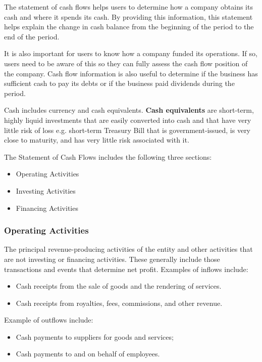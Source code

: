 \documentclass[../main.tex]{subfiles}
\begin{document}
	The statement of cash flows helps users to determine how a company obtains 
	its cash and where it spends its cash. By providing this information, this 
	statement helps explain the change in cash balance from the beginning of 
	the period to the end of the period. 
	
	It is also important for users to know how a company funded its operations. 
	If so, users need to be aware of this so they can fully assess the cash 
	flow position of the company. Cash flow information is also useful to 
	determine if the business has sufficient cash to pay its debts or if the 
	business paid dividends during the period. 
	
	Cash includes currency and cash equivalents. \textbf{Cash equivalents} are 
	short-term, highly liquid investments that are easily converted into cash 
	and that have very little risk of loss e.g. short-term Treasury Bill that 
	is government-issued, is very close to maturity, and has very little risk 
	associated with it. 
	
	The Statement of Cash Flows includes the following three sections:
	\begin{itemize}[noitemsep]
		\item Operating Activities
		\item Investing Activities
		\item Financing Activities
	\end{itemize}
	
	\subsubsection{Operating Activities}
	
	The principal revenue-producing activities of the entity and other 
	activities that are not investing or financing activities. These generally 
	include those transactions and events that determine net profit. Examples 
	of inflows include:
	\begin{itemize}[noitemsep]
		\item Cash receipts from the sale of goods and the rendering of 
		services.
		\item Cash receipts from royalties, fees, commissions, and other 
		revenue.
	\end{itemize}
	Example of outflows include:
	\begin{itemize}[noitemsep]
		\item Cash payments to suppliers for goods 
		and services; 
		\item Cash payments to and on behalf of employees.
	\end{itemize}
	
\end{document}
